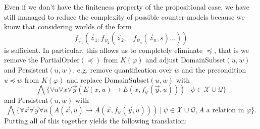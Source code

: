 \documentclass[runningheads]{llncs}
\begin{document}
Even if we don't have the finiteness property of the propositional case, we have still managed to reduce the complexity of possible counter-models because we know that considering worlds of the form $$f_{\psi_1}(\vec z_1, f_{\psi_2}(\vec z_2, \dots f_{\psi_n}(\vec z_n, s)\dots))$$ is sufficient.
In particular, this allows us to completely eliminate $\preceq$, that is we remove the PartialOrder$(\preceq)$
from $K(\varphi)$ and adjust DomainSubset$(u, w)$ and Persistent$(u, w)$, e.g. remove quantification over $w$ and the precondition $u\preceq w$ from $K(\varphi)$ and replace DomainSubset$(u, w)$ with
$$
	\bigwedge\{\forall u\forall x\forall\vec y(E(x, u)\to E(x, f_\psi(\vec y, u)))\:|\:\psi\in\mathcal X\cup\mathcal Q\}
$$
and Persistent$(u, w)$ with
$$
	\bigwedge\{\forall\vec x\forall\vec y\forall u(A(\vec x, u)\to A(\vec x, f_\psi(\vec y, u)))\:|\:\psi\in\mathcal X\cup\mathcal Q, \text{$A$ a relation in $\varphi$}\}.
$$Putting all of this together yields the following translation:
\end{document}
